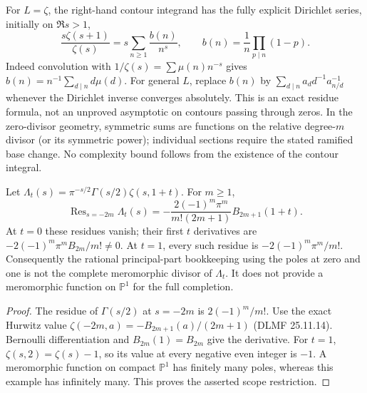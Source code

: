 For $L=\zeta$, the right-hand contour integrand has the fully explicit
Dirichlet series, initially on $\Re s>1$,
\[
 \frac{s\zeta(s+1)}{\zeta(s)}
 =s\sum_{n\ge1}\frac{b(n)}{n^s},\qquad
 b(n)=\frac1n\prod_{p\mid n}(1-p).
\]
Indeed convolution with $1/\zeta(s)=\sum\mu(n)n^{-s}$ gives
$b(n)=n^{-1}\sum_{d\mid n}d\mu(d)$. For general $L$, replace
$b(n)$ by $\sum_{d\mid n}a_d d^{-1}a^{-1}_{n/d}$ whenever the
Dirichlet inverse converges absolutely. This is an exact residue
formula, not an unproved asymptotic on contours passing through zeros.
In the zero-divisor geometry, symmetric sums are functions on the relative
degree-$m$ divisor (or its symmetric power); individual sections require
the stated ramified base change. No complexity bound follows from the
existence of the contour integral.

\begin{proposition}
Let $\Lambda_t(s)=\pi^{-s/2}\Gamma(s/2)\zeta(s,1+t)$. For $m\ge1$,
\[
 \operatorname{Res}_{s=-2m}\Lambda_t(s)
 =-\frac{2(-1)^m\pi^m}{m!(2m+1)}B_{2m+1}(1+t).
\]
At $t=0$ these residues vanish; their first $t$ derivatives are
$-2(-1)^m\pi^mB_{2m}/m!\ne0$. At $t=1$, every such residue is
$-2(-1)^m\pi^m/m!$. Consequently the rational principal-part
bookkeeping using the poles at zero and one is not the complete
meromorphic divisor of $\Lambda_t$. It does not provide a meromorphic
function on $\mathbb P^1$ for the full completion.
\end{proposition}
\begin{proof}
The residue of $\Gamma(s/2)$ at $s=-2m$ is $2(-1)^m/m!$.
Use the exact Hurwitz value
$\zeta(-2m,a)=-B_{2m+1}(a)/(2m+1)$ (DLMF 25.11.14).
Bernoulli differentiation and $B_{2m}(1)=B_{2m}$ give the derivative.
For $t=1$, $\zeta(s,2)=\zeta(s)-1$, so its value at every negative
even integer is $-1$. A meromorphic function on compact
$\mathbb P^1$ has finitely many poles, whereas this example has
infinitely many. This proves the asserted scope restriction.
\end{proof}

